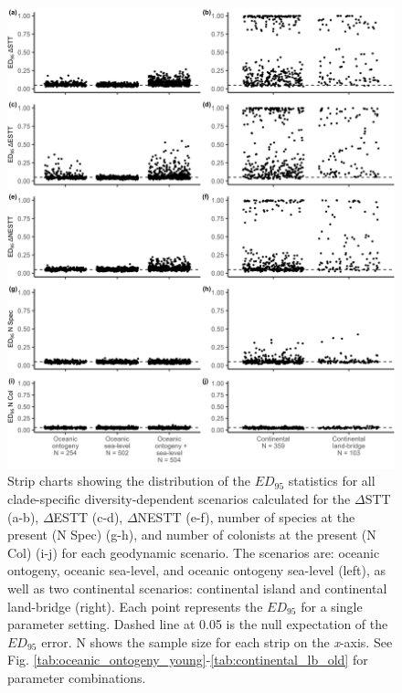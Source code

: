 \begin{figure}
    \centering
    \includegraphics[width=\textwidth]{JBI-21-0508_FigS4.png}
    \caption{Strip charts showing the distribution of the $ED_{95}$ statistics for all clade-specific diversity-dependent scenarios calculated for the $\Delta$STT (a-b), $\Delta$ESTT (c-d), $\Delta$NESTT (e-f), number of species at the present (N Spec) (g-h), and number of colonists at the present (N Col) (i-j) for each geodynamic scenario. The scenarios are: oceanic ontogeny, oceanic sea-level, and oceanic ontogeny sea-level (left), as well as two continental scenarios: continental island and continental land-bridge (right). Each point represents the $ED_{95}$ for a single parameter setting. Dashed line at 0.05 is the null expectation of the $ED_{95}$ error. N shows the sample size for each strip on the \textit{x}-axis. See Fig. \ref{tab:oceanic_ontogeny_young}-\ref{tab:continental_lb_old} for parameter combinations.}
    \label{fig:facet_scenario_cs}
\end{figure}

